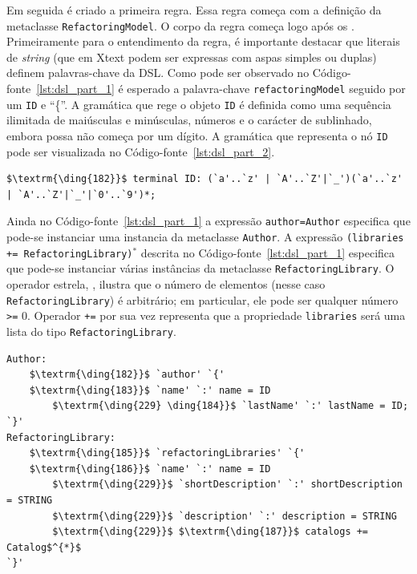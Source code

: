 Em seguida é criado a primeira regra. Essa regra começa com a definição da metaclasse \texttt{RefactoringModel}. O corpo da regra começa logo após os \aspas{\texttt{:}}. Primeiramente para o entendimento da regra, é importante destacar que literais de \textit{string} (que em Xtext podem ser expressas com aspas simples ou duplas) definem palavras-chave da DSL. Como pode ser observado no Código-fonte~\ref{lst:dsl_part_1} é esperado a palavra-chave \texttt{refactoringModel} seguido por um \texttt{ID} e ``\{''. A gramática que rege o objeto \texttt{ID} é definida como uma sequência ilimitada de maiúsculas e minúsculas, números e o carácter de sublinhado, embora possa não começa por um dígito. A gramática que representa o nó \texttt{ID} pode ser visualizada no Código-fonte~\ref{lst:dsl_part_2}. 

\begin{lstlisting}[language=Xtext, frame=single, basicstyle=\scriptsize, mathescape=true, label={lst:dsl_part_2}, caption={Gramática da DSL - parte 2}]
	$\textrm{\ding{182}}$ terminal ID: (`a'..`z' | `A'..`Z'|`_')(`a'..`z' | `A'..`Z'|`_'|`0'..`9')*;
\end{lstlisting}

Ainda no Código-fonte~\ref{lst:dsl_part_1} a expressão \texttt{author=Author} especifica que pode-se instanciar uma instancia da metaclasse \texttt{Author}. A expressão \texttt{(libraries += RefactoringLibrary)$^{*}$} descrita no Código-fonte~\ref{lst:dsl_part_1} especifica que pode-se instanciar várias instâncias da metaclasse \texttt{RefactoringLibrary}. O operador estrela, \aspas{\texttt{*}}, ilustra que o número de elementos (nesse caso \texttt{RefactoringLibrary}) é arbitrário; em particular, ele pode ser qualquer número \texttt{>=} 0. Operador \texttt{+=} por sua vez representa que a propriedade \texttt{libraries} será uma lista do tipo \texttt{RefactoringLibrary}.

\begin{lstlisting}[language=Xtext, frame=single, basicstyle=\scriptsize, mathescape=true, label={lst:dsl_part_3}, caption={Gramática da DSL - parte 3}]
Author:
	$\textrm{\ding{182}}$ `author' `{'
	$\textrm{\ding{183}}$ `name' `:' name = ID  
		$\textrm{\ding{229} \ding{184}}$ `lastName' `:' lastName = ID; 
`}'
RefactoringLibrary:
	$\textrm{\ding{185}}$ `refactoringLibraries' `{'
	$\textrm{\ding{186}}$ `name' `:' name = ID  
		$\textrm{\ding{229}}$ `shortDescription' `:' shortDescription = STRING
		$\textrm{\ding{229}}$ `description' `:' description = STRING
		$\textrm{\ding{229}}$ $\textrm{\ding{187}}$ catalogs += Catalog$^{*}$
`}'
\end{lstlisting}

